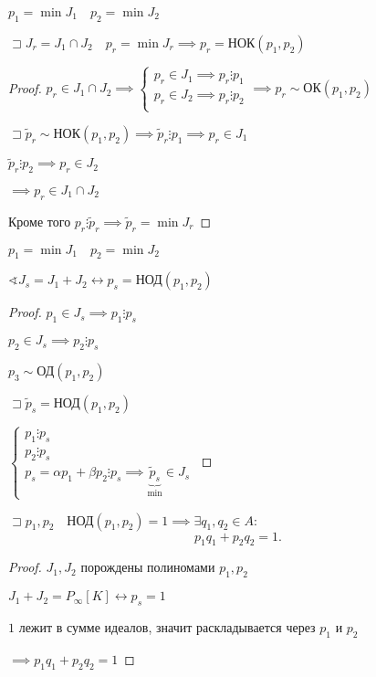 \documentclass{book}
\newcommand{\tl}[1]{\widetilde{#1}}
\theoremstyle{definition}
\begin{document}
\begin{lemma}
    $p_1 = \min J_1\quad p_2 = \min J_2$

    $\sqsupset J_r = J_1 \cap J_2 \quad  p_r = \min J_r \implies  p_r = \text{НОК}\left( p_1,p_2 \right) $
\end{lemma}
\begin{proof}
    $p_r\in J_1 \cap J_2 \implies  \begin{cases}
        p_r \in J_1 \implies p_r \vdots p_1\\
        p_r \in J_2 \implies  p_r \vdots p_2\\
    \end{cases} \implies p_r \sim  \text{ОК}\left( p_1, p_2 \right)$

    $\sqsupset \tl p_r \sim  \text{НОК}\left( p_1, p_2 \right) \implies \tl p_r \vdots p_1 \implies p_r\in J_1$ 

    $\tl p_r \vdots p_2 \implies p_r\in J_2$

    $\implies p_r\in J_1\cap J_2$

    Кроме того $p_r\vdots \tl p_r \implies \tl p_r = \min J_r$
\end{proof}

\begin{lemma}
    $p_1 = \min J_1\quad p_2 = \min J_2$

    $\sphericalangle J_s = J_1 + J_2 \leftrightarrow p_s = \text{НОД}\left( p_1,p_2 \right)  $
\end{lemma}
\begin{proof}
    $p_1\in J_s \implies  p_1\vdots p_s$

    $p_2\in J_s \implies  p_2 \vdots p_s$

    $p_3 \sim \text{ОД}\left( p_1,p_2 \right) $

    $\sqsupset \tl p_s = \text{НОД}\left( p_1,p_2 \right) $ 

    $\begin{cases}
        p_1 \vdots p_s\\
        p_2 \vdots p_s\\
        p_s = \alpha p_1 + \beta p_2 \vdots p_s \implies \underbrace{\tl p_s}_{\min}\in J_s
    \end{cases}$
\end{proof}

\begin{theorem}
    $\sqsupset p_1,p_2\quad \text{НОД}\left( p_1,p_2 \right)  = 1 \implies \exists q_1,q_2\in A:$ 
    \[
    p_1q_1+p_2q_2=1
    .\] 
\end{theorem}
\begin{proof}
    $J_1, J_2$ порождены полиномами $p_1,p_2$ 

    $J_1+J_2 = P_{\infty }[K]\longleftrightarrow p_s = 1$

    $1$ лежит в сумме идеалов, значит раскладывается через  $p_1$ и $p_2$

    $\implies  p_1q_1+p_2q_2=1$
\end{proof}
\end{document}
